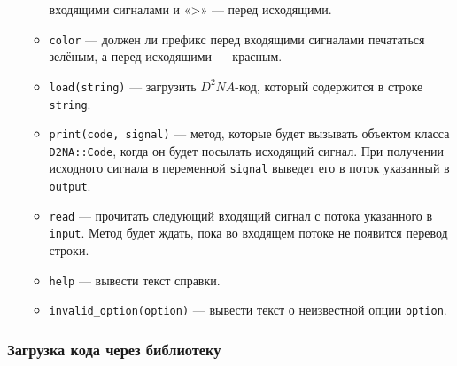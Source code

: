 \documentclass[utf8,a5paper,portrait,10pt]{eskdtext}
\begin{document}
\begin{itemize}
\begin{itemize}
                входящими сигналами и «>» — перед исходящими.
          \item \texttt{color} — должен ли префикс перед входящими сигналами
                печататься зелёным, а перед исходящими — красным.
          \item \texttt{load(string)} — загрузить $D^2NA$-код, который
                содержится в строке \texttt{string}.
          \item \texttt{print(code, signal)} — метод, которые будет вызывать
                объектом класса \texttt{D2NA::Code}, когда он будет посылать
                исходящий сигнал. При получении исходного сигнала в переменной
                \texttt{signal} выведет его в поток указанный в \texttt{output}.
          \item \texttt{read} — прочитать следующий входящий сигнал с потока
                указанного в \texttt{input}. Метод будет ждать, пока во
                входящем потоке не появится перевод строки.
          \item \texttt{help} — вывести текст справки.
          \item \texttt{invalid\_option(option)} — вывести текст о неизвестной
                опции \texttt{option}.
        \end{itemize}
\end{itemize}

\subsubsection{Загрузка кода через библиотеку}
\end{document}
